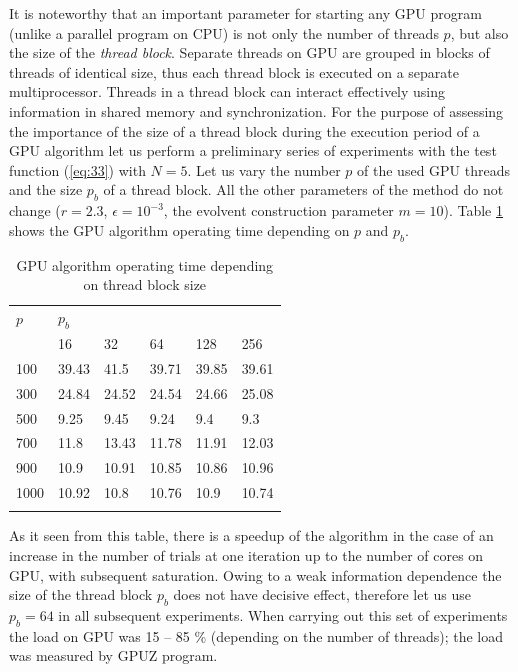 \documentclass[smallcondensed]{svjour3}     %
\begin{document}
It is noteworthy that an important parameter for starting any GPU program (unlike a parallel program on CPU) is not only the number of threads $p$, but also the size of the \textit{thread block}. Separate threads on GPU are grouped in blocks of threads of identical size, thus each thread block is executed on a separate multiprocessor. Threads in a thread block can interact effectively using information in shared memory and synchronization. For the purpose of assessing the importance of the size of a thread block during the execution period of a GPU algorithm let us perform a preliminary series of experiments with the test function (\ref{eq:33}) with $N=5$. Let us vary the number $p$ of the used GPU threads and the size $p_b$ of a thread block. All the other parameters of the method do not change ($r=2.3$, $\epsilon = 10^{-3}$, the evolvent construction parameter $m=10$). Table \ref{tab:2} shows the GPU algorithm operating time depending on $p$ and $p_b$.
\begin{table}
	\caption{GPU algorithm operating time depending on thread block size}
	\label{tab:2}
	\center
	\begin{tabular}{llllll}
		\hline\noalign{\smallskip}
		$p$ & \multicolumn{5}{l}{ \hfil $p_b$ \hfil } \\
		\noalign{\smallskip} \cline{2-6} \noalign{\smallskip}
		 & 16 & 32 & 64 & 128 & 256  \\
		\noalign{\smallskip} \hline \noalign{\smallskip}
		100 &	39.43 &	41.5 &	39.71 &	39.85 &	39.61 \\
		300 &	24.84 &	24.52 &	24.54 &	24.66 &	25.08 \\
		500 &	9.25 &	9.45 &	9.24 &	9.4 &	9.3\\
		700 &	11.8 &	13.43 &	11.78 &	11.91 &	12.03\\
		900 &	10.9 &	10.91 &	10.85 &	10.86 &	10.96\\
		1000 &	10.92 &	10.8 &	10.76 &	10.9 &	10.74\\
		\noalign{\smallskip}\hline
	\end{tabular}
\end{table}

As it seen from this table, there is a speedup of the algorithm in the case of an increase in the number of trials at one iteration up to the number of cores on GPU, with subsequent saturation. Owing to a weak information dependence the size of the thread block $p_b$ does not have decisive effect, therefore let us use $p_b=64$ in all subsequent experiments. When carrying out this set of experiments the load on GPU was 15 -- 85 \% (depending on the number of threads); the load was measured by GPUZ program.
\end{document}
